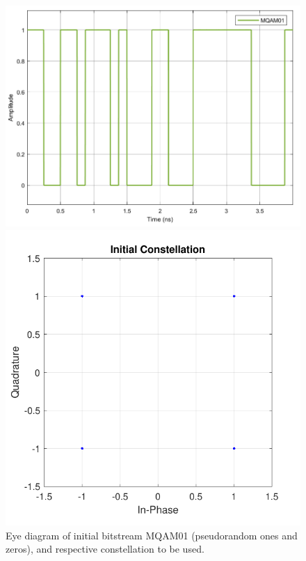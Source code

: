 	\begin{figure}[H]
			\centering
\begin{minipage}{0.45\textwidth}
	\centering
	\includegraphics[width=1\textwidth]
	{./sdf/m_qam_system/figures/simulations/01_noISI/MQAM01.pdf}
	\subcaption{}
\end{minipage}
\begin{minipage}{0.4\textwidth}
	\centering
	\includegraphics[width=\textwidth]
	{./sdf/m_qam_system/figures/simulations/01_noISI/constStart.pdf}
	\subcaption{}
\end{minipage}
			\caption{Eye diagram of initial bitstream MQAM01 (pseudorandom ones and 
			zeros), and respective constellation to be used.}
	\end{figure}

